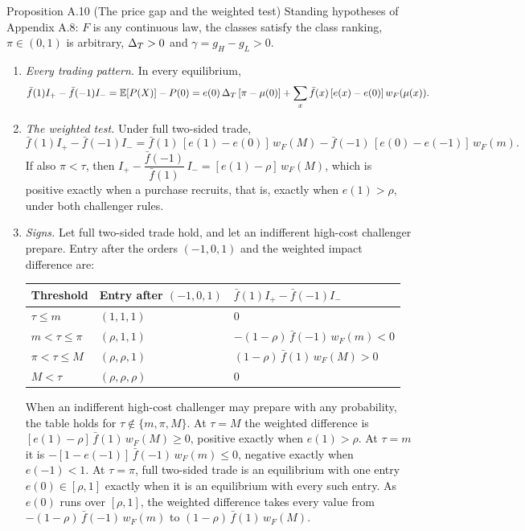 \begin{paperresult}{Proposition A.10 (The price gap and the weighted test)}
Standing hypotheses of Appendix A.8: \(F\) is any continuous law, the classes satisfy the class ranking, \(\pi\in(0,1)\) is arbitrary, \(\Delta_T>0\) and \(\gamma=g_H-g_L>0\).
\begin{enumerate}[label=(\roman*),leftmargin=2em]
\item \emph{Every trading pattern.} In every equilibrium,
\[
\bar f(1)I_+-\bar f(-1)I_-=\mathbb{E}[P(X)]-P(0)=e(0)\,\Delta_T\,[\pi-\mu(0)]+\sum_x\bar f(x)\,[e(x)-e(0)]\,w_F(\mu(x)).
\]
\item \emph{The weighted test.} Under full two-sided trade,
\[
\bar f(1)I_+-\bar f(-1)I_-=\bar f(1)\,[e(1)-e(0)]\,w_F(M)-\bar f(-1)\,[e(0)-e(-1)]\,w_F(m).
\]
If also \(\pi<\tau\), then \(I_+-\dfrac{\bar f(-1)}{\bar f(1)}\,I_-=[e(1)-\rho]\,w_F(M)\), which is positive exactly when a purchase recruits, that is, exactly when \(e(1)>\rho\), under both challenger rules.
\item \emph{Signs.} Let full two-sided trade hold, and let an indifferent high-cost challenger prepare. Entry after the orders \((-1,0,1)\) and the weighted impact difference are:
\begin{center}\normalfont\small
\begin{tabular}{@{}lll@{}}
\toprule
Threshold & Entry after \((-1,0,1)\) & \(\bar f(1)I_+-\bar f(-1)I_-\)\\
\midrule
\(\tau\le m\) & \((1,1,1)\) & \(0\)\\
\(m<\tau\le\pi\) & \((\rho,1,1)\) & \(-(1-\rho)\,\bar f(-1)\,w_F(m)<0\)\\
\(\pi<\tau\le M\) & \((\rho,\rho,1)\) & \((1-\rho)\,\bar f(1)\,w_F(M)>0\)\\
\(M<\tau\) & \((\rho,\rho,\rho)\) & \(0\)\\
\bottomrule
\end{tabular}
\end{center}
When an indifferent high-cost challenger may prepare with any probability, the table holds for \(\tau\notin\{m,\pi,M\}\). At \(\tau=M\) the weighted difference is \([e(1)-\rho]\,\bar f(1)\,w_F(M)\ge0\), positive exactly when \(e(1)>\rho\). At \(\tau=m\) it is \(-[1-e(-1)]\,\bar f(-1)\,w_F(m)\le0\), negative exactly when \(e(-1)<1\). At \(\tau=\pi\), full two-sided trade is an equilibrium with one entry \(e(0)\in[\rho,1]\) exactly when it is an equilibrium with every such entry. As \(e(0)\) runs over \([\rho,1]\), the weighted difference takes every value from \(-(1-\rho)\,\bar f(-1)\,w_F(m)\) to \((1-\rho)\,\bar f(1)\,w_F(M)\).

\end{enumerate}
\end{paperresult}
